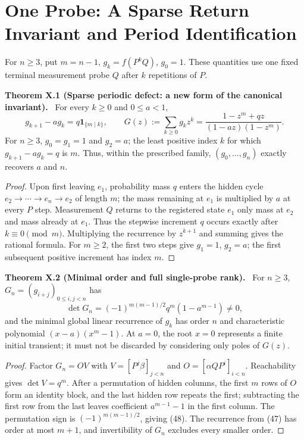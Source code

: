 \documentclass[11pt,a4paper,oneside]{book}
\newcommand{\one}{\mathbf 1}\newcommand{\ii}{\mathrm i}\newcommand{\dd}{\mathrm d}
\newcommand{\statement}[3]{\par\medskip\noindent\textbf{#1 #2 (#3).}\ }
\begin{document}
\chapter{One Probe: A Sparse Return Invariant and Period Identification}
For $n\ge3$, put $m=n-1$, $g_k=f(P^kQ)$, $g_0=1$. These quantities use one fixed terminal measurement probe $Q$ after $k$ repetitions of $P$.
\statement{Theorem}{X.1}{Sparse periodic defect: a new form of the canonical invariant} For every $k\ge0$ and $0\le a<1$,
\begin{equation}g_{k+1}-ag_k=q\one_{\{m\mid k\}},\qquad G(z):=\sum_{k\ge0}g_kz^k=\frac{1-z^m+qz}{(1-az)(1-z^m)}.\tag{47}\end{equation}
For $n\ge3$, $g_0=g_1=1$ and $g_2=a$; the least positive index $k$ for which $g_{k+1}-ag_k=q$ is $m$. Thus, within the prescribed family, $(g_0,\ldots,g_n)$ exactly recovers $a$ and $n$.
\begin{proof}Upon first leaving $e_1$, probability mass $q$ enters the hidden cycle $e_2\to\cdots\to e_n\to e_2$ of length $m$; the mass remaining at $e_1$ is multiplied by $a$ at every $P$ step. Measurement $Q$ returns to the registered state $e_1$ only mass at $e_2$ and mass already at $e_1$. Thus the stepwise increment $q$ occurs exactly after $k\equiv0\pmod m$. Multiplying the recurrence by $z^{k+1}$ and summing gives the rational formula. For $m\ge2$, the first two steps give $g_1=1$, $g_2=a$; the first subsequent positive increment has index $m$.\end{proof}
\statement{Theorem}{X.2}{Minimal order and full single-probe rank} For $n\ge3$, $G_n=(g_{i+j})_{0\le i,j<n}$ has
\begin{equation}\det G_n=(-1)^{m(m-1)/2}q^m(1-a^{m-1})\ne0,\tag{48}\end{equation}
and the minimal global linear recurrence of $g_k$ has order $n$ and characteristic polynomial $(x-a)(x^m-1)$. At $a=0$, the root $x=0$ represents a finite initial transient; it must not be discarded by considering only poles of $G(z)$.
\begin{proof}Factor $G_n=OV$ with $V=[P^j\beta]_{j<n}$ and $O=[\alpha QP^i]_{i<n}$. Reachability gives $\det V=q^m$. After a permutation of hidden columns, the first $m$ rows of $O$ form an identity block, and the last hidden row repeats the first; subtracting the first row from the last leaves coefficient $a^{m-1}-1$ in the first column. The permutation sign is $(-1)^{m(m-1)/2}$, giving (48). The recurrence from (47) has order at most $m+1$, and invertibility of $G_n$ excludes every smaller order.\end{proof}
\end{document}
